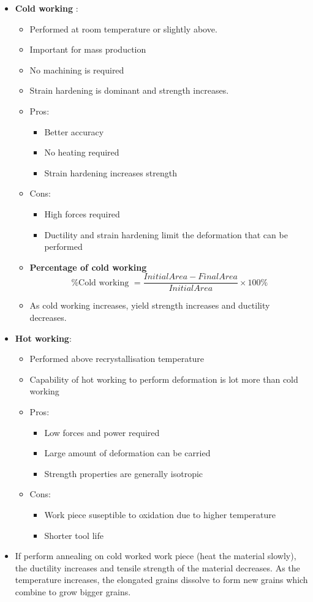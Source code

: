 \documentclass{article}
\begin{document}
\begin{itemize}
		\item \textbf{Cold working} : 
			\begin{itemize}
				\item Performed at room temperature or slightly above. 
				\item Important for mass production
				\item No machining is required
				\item Strain hardening is dominant and strength increases.
				\item Pros:
					\begin{itemize}
						\item Better accuracy
						\item No heating required
						\item Strain hardening increases strength
					\end{itemize}
				\item Cons:
					\begin{itemize}
						\item High forces required
						\item Ductility and strain hardening limit the deformation that can be performed
					\end{itemize}
				\item \textbf{Percentage of cold working}
				\[\text{\% Cold working }= \frac{Initial Area - Final Area}{Initial Area} \times 100\%\]
				\item As cold working increases, yield strength increases and ductility decreases. 
			\end{itemize}

		\item \textbf{Hot working}:
			\begin{itemize}
				\item Performed above recrystallisation temperature
				\item Capability of hot working to perform deformation is lot more than cold working
				\item Pros:
					\begin{itemize}
						\item Low forces and power required
						\item Large amount of deformation can be carried
						\item Strength properties are generally isotropic
					\end{itemize}
				\item Cons:
					\begin{itemize}
						\item Work piece suseptible to oxidation due to higher temperature
						\item Shorter tool life
					\end{itemize}
			\end{itemize}

		\item If perform annealing on cold worked work piece (heat the material slowly), the ductility increases and tensile strength of the material decreases. As the temperature increases, the elongated grains dissolve to form new grains which combine to grow bigger grains. 
	\end{itemize}
\end{document}
